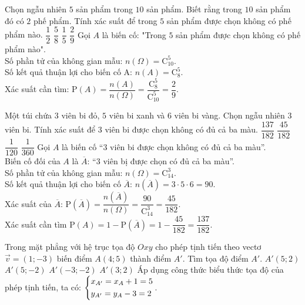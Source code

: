 \begin{ex}%
	Chọn ngẫu nhiên $5$ sản phẩm trong $10$ sản phẩm. Biết rằng trong $10$ sản phẩm đó có $2$ phế phẩm. Tính xác suất để trong $5$ sản phẩm được chọn không có phế phẩm nào.
	\choice
	{$\dfrac{1}{2}$}
	{$\dfrac{5}{8}$}
	{$\dfrac{1}{5}$}
	{\True $\dfrac{2}{9}$}
	\loigiai
	{Gọi $A$ là biến cố: "Trong $5$ sản phẩm được chọn không có phế phẩm nào".\\
		Số phần tử của không gian mẫu: $n(\Omega )=\mathrm{C}_{10}^5$.\\
		Số kết quả thuận lợi cho biến cố A: $n(A)=\mathrm{C}_8^5$.\\
		Xác suất cần tìm: $\mathrm{P}(A)=\dfrac{n(A)}{n(\Omega )}=\dfrac{\mathrm{C}_8^5}{\mathrm{C}_{10}^5}=\dfrac{2}{9}$.}
\end{ex}
\begin{ex}%
	Một túi chứa $3$ viên bi đỏ, $5$ viên bi xanh và $6$ viên bi vàng. Chọn ngẫu nhiên $3$ viên bi. Tính xác suất để $3$ viên bi được chọn không có đủ cả ba màu.
	\choice
	{\True $\dfrac{137}{182}$}
	{$\dfrac{45}{182}$}
	{$\dfrac{1}{120}$}
	{$\dfrac{1}{360}$}
	\loigiai
	{Gọi $A$ là biến cố “$3$ viên bi được chọn không có đủ cả ba màu”.\\
		Biến cố đối của $A$ là $\overline{A}$: “$3$ viên bị được chọn có đủ cả ba màu”.\\
		Số phần tử của không gian mẫu: $n(\Omega )=\mathrm{C}_{14}^3$.\\
		Số kết quả thuận lợi cho biến cố $\overline{A}$: $n(\overline{A})=3\cdot 5\cdot 6=90$.\\
		Xác suất của $\overline{A}$: $\mathrm{P}(\overline{A})=\dfrac{n(\overline{A})}{n(\Omega )}=\dfrac{90}{\mathrm{C}_{14}^3}=\dfrac{45}{182}$.\\
		Xác suất cần tìm $\mathrm{P}(A)=1-\mathrm{P}(\overline{A})=1-\dfrac{45}{182}=\dfrac{137}{182}$.}
\end{ex}

\begin{ex}%
	Trong mặt phẳng với hệ trục tọa độ $Oxy$ cho phép tịnh tiến theo vectơ $\overrightarrow{v}=(1;-3)$ biến điểm $A(4;5)$ thành điểm $A'$. Tìm tọa độ điểm $A'$.
	\choice
	{\True $A'(5;2)$}
	{$A'(5;-2)$}
	{$A'(-3;-2)$}
	{$A'(3;2)$}
	\loigiai
	{Áp dụng công thức biểu thức tọa độ của phép tịnh tiến, ta có:
		$\left\{\begin{aligned}
		& x_{A'}=x_A+1=5 \\
		& y_{A'}=y_A-3=2\end{aligned}\right.$.
	}
\end{ex}

